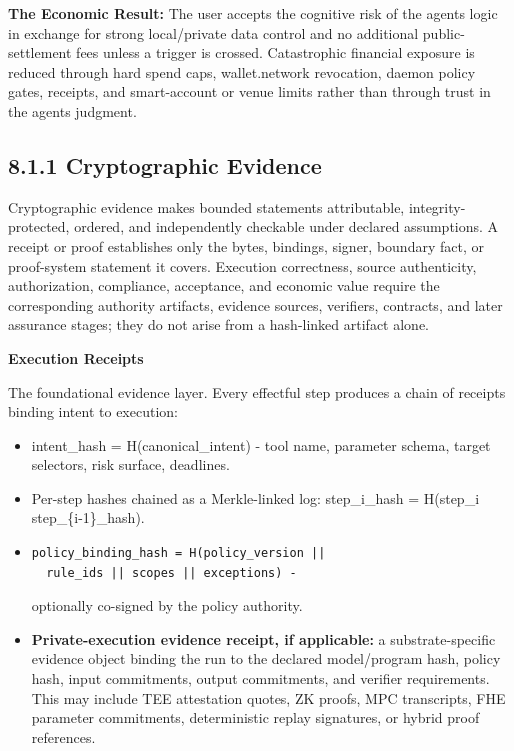 \documentclass[
  11pt,
]{article}
\providecommand{\tightlist}{%
  \setlength{\itemsep}{0pt}\setlength{\parskip}{0pt}}
\begin{document}
\textbf{The Economic Result:} The user accepts the cognitive risk of the
agent\textquotesingle s logic in exchange for strong local/private data
control and no additional public-settlement fees unless a trigger is
crossed. Catastrophic financial exposure is reduced through hard spend
caps, wallet.network revocation, daemon policy gates, receipts, and
smart-account or venue limits rather than through trust in the
agent\textquotesingle s judgment.

\hypertarget{cryptographic-evidence}{%
\subsection{8.1.1 Cryptographic Evidence}\label{cryptographic-evidence}}

Cryptographic evidence makes bounded statements attributable, integrity-
protected, ordered, and independently checkable under declared assumptions. A
receipt or proof establishes only the bytes, bindings, signer, boundary fact,
or proof-system statement it covers. Execution correctness, source
authenticity, authorization, compliance, acceptance, and economic value require
the corresponding authority artifacts, evidence sources, verifiers, contracts,
and later assurance stages; they do not arise from a hash-linked artifact
alone.

\textbf{Execution Receipts}

The foundational evidence layer. Every effectful step produces a chain
of receipts binding intent to execution:

\begin{itemize}
\tightlist
\item
  intent\_hash = H(canonical\_intent) - tool name, parameter schema,
  target selectors, risk surface, deadlines.
\item
  Per-step hashes chained as a Merkle-linked log: step\_i\_hash =
  H(step\_i \textbar\textbar{} step\_\{i-1\}\_hash).
\item
\begin{lstlisting}[language={},basicstyle=\ttfamily\scriptsize]
  policy_binding_hash = H(policy_version ||
  rule_ids || scopes || exceptions) -
\end{lstlisting}
  optionally co-signed by the policy authority.
\item
  \textbf{Private-execution evidence receipt, if applicable:} a
  substrate-specific evidence object binding the run to the declared
  model/program hash, policy hash, input commitments, output
  commitments, and verifier requirements. This may include TEE
  attestation quotes, ZK proofs, MPC transcripts, FHE parameter
  commitments, deterministic replay signatures, or hybrid proof
  references.
\end{itemize}
\end{document}
